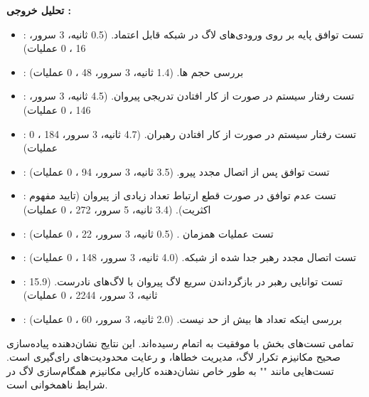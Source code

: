 \documentclass[12pt,a4paper]{article}
\begin{document}
\textbf{تحلیل خروجی :}
\begin{itemize}
    \item {}: تست توافق پایه بر روی ورودی‌های لاگ در شبکه قابل اعتماد. (0.5 ثانیه، 3 سرور، 16 ، 0 عملیات)
    \item {}: بررسی حجم ها. (1.4 ثانیه، 3 سرور، 48 ، 0 عملیات)
    \item {}: تست رفتار سیستم در صورت از کار افتادن تدریجی پیروان. (4.5 ثانیه، 3 سرور، 146 ، 0 عملیات)
    \item {}: تست رفتار سیستم در صورت از کار افتادن رهبران. (4.7 ثانیه، 3 سرور، 184 ، 0 عملیات)
    \item {}: تست توافق پس از اتصال مجدد پیرو. (3.5 ثانیه، 3 سرور، 94 ، 0 عملیات)
    \item {}: تست عدم توافق در صورت قطع ارتباط تعداد زیادی از پیروان (تایید مفهوم اکثریت). (3.4 ثانیه، 5 سرور، 272 ، 0 عملیات)
    \item {}: تست عملیات همزمان . (0.5 ثانیه، 3 سرور، 22 ، 0 عملیات)
    \item {}: تست اتصال مجدد رهبر جدا شده از شبکه. (4.0 ثانیه، 3 سرور، 148 ، 0 عملیات)
    \item {}: تست توانایی رهبر در بازگرداندن سریع لاگ پیروان با لاگ‌های نادرست. (15.9 ثانیه، 3 سرور، 2244 ، 0 عملیات)
    \item {}: بررسی اینکه تعداد ها بیش از حد نیست. (2.0 ثانیه، 3 سرور، 60 ، 0 عملیات)
\end{itemize}

تمامی تست‌های بخش  با موفقیت به اتمام رسیده‌اند. این نتایج نشان‌دهنده پیاده‌سازی صحیح مکانیزم تکرار لاگ، مدیریت خطاها، و رعایت محدودیت‌های رای‌گیری است. تست‌هایی مانند "" به طور خاص نشان‌دهنده کارایی مکانیزم همگام‌سازی لاگ در شرایط ناهمخوانی است.
\end{document}
